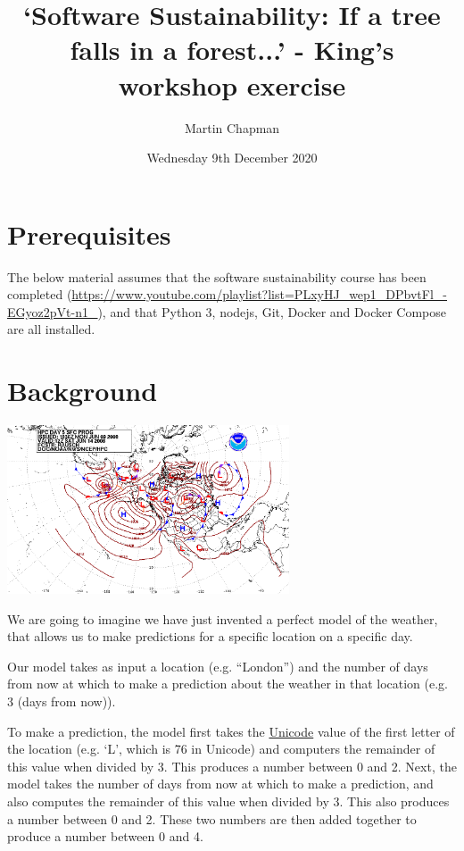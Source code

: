 \documentclass{article}
\title{`Software Sustainability: If a tree falls in a forest...' -
King's workshop exercise}
\author{Martin Chapman}
\date{Wednesday 9th December 2020}
\begin{document}

\maketitle

\section{Prerequisites}

The below material assumes that the software sustainability course has been completed (\href{https://www.youtube.com/playlist?list=PLxyHJ\_wep1\_DPbvtFl\_-EGyoz2pVt-n1\_}{https://www.youtube.com/playlist?list=PLxyHJ\_wep1\_DPbvtFl\_-EGyoz2pVt-n1\_}), and that Python 3, nodejs, Git, Docker and Docker Compose are all installed. 

\section{Background}

\begin{center}
    \includegraphics[height=5cm]{weather.png}
\end{center}

We are going to imagine we have just invented a perfect model of
the weather, that allows us to make predictions for a specific
location on a specific day.

Our model takes as input a location (e.g. ``London'') and the
number of days from now at which to make a prediction about
the weather in that location (e.g. 3 (days from now)).

To make a prediction, the model first takes the \href{https://en.wikipedia.org/wiki/List_of_Unicode_characters}{Unicode} value of
the first letter of the location (e.g. `L', which is 76 in
Unicode) and computers the remainder of this value when divided
by 3. This produces a number between 0 and 2. Next, the model
takes the number of days from now at which to make a prediction,
and also computes the remainder of this value when divided by 3.
This also produces a number between 0 and 2. These two numbers
are then added together to produce a number between 0 and 4.
\end{document}
